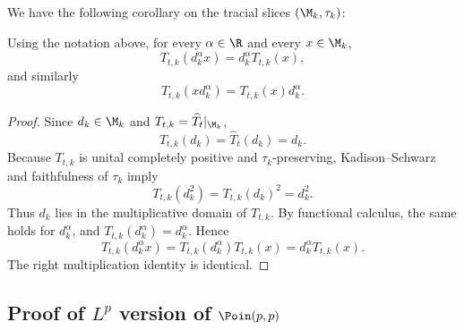 \documentclass[sn-mathphys-num]{sn-jnl}
\begin{document}
We have the following corollary on the tracial slices $(\M_k,\tau_k)$:
\begin{cor}\label{cor:d_k}
Using the notation above, for every $\alpha\in \R$ and every $x\in \M_k$,
\[
  T_{t,k}(d_k^\alpha x)
  =
  d_k^\alpha T_{t,k}(x),
\]
and similarly
\[
  T_{t,k}(x d_k^\alpha)
  =
  T_{t,k}(x)d_k^\alpha .
\]
\end{cor}

\begin{proof}
Since $d_k\in \M_k$ and $T_{t,k}=\widehat T_t|_{\M_k}$,
\[
  T_{t,k}(d_k)=\widehat T_t(d_k)=d_k .
\]
Because $T_{t,k}$ is unital completely positive and $\tau_k$-preserving,
Kadison--Schwarz and faithfulness of $\tau_k$ imply
\[
  T_{t,k}(d_k^2)=T_{t,k}(d_k)^2=d_k^2 .
\]
Thus $d_k$ lies in the multiplicative domain of $T_{t,k}$. By functional
calculus, the same holds for $d_k^\alpha$, and $T_{t,k}(d_k^\alpha)=d_k^\alpha$.
Hence
\[
  T_{t,k}(d_k^\alpha x)
  =
  T_{t,k}(d_k^\alpha)T_{t,k}(x)
  =
  d_k^\alpha T_{t,k}(x).
\]
The right multiplication identity is identical.
\end{proof}
\subsection{Proof of \texorpdfstring{$L^p$}{Lp} version of \texorpdfstring{$\Poin(p,p)$}{Poin(p,p)}}\label{sec:pf-lp-p}
\end{document}
